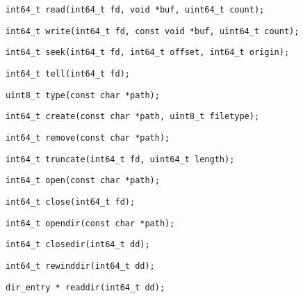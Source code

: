 \begin{lstlisting}[style=customc]
int64_t read(int64_t fd, void *buf, uint64_t count);
\end{lstlisting}
\begin{lstlisting}[style=customc]
int64_t write(int64_t fd, const void *buf, uint64_t count);
\end{lstlisting}
\begin{lstlisting}[style=customc]
int64_t seek(int64_t fd, int64_t offset, int64_t origin);
\end{lstlisting}
\begin{lstlisting}[style=customc]
int64_t tell(int64_t fd);
\end{lstlisting}
\begin{lstlisting}[style=customc]
uint8_t type(const char *path);
\end{lstlisting}
\begin{lstlisting}[style=customc]
int64_t create(const char *path, uint8_t filetype);
\end{lstlisting}
\begin{lstlisting}[style=customc]
int64_t remove(const char *path); 
\end{lstlisting}
\begin{lstlisting}[style=customc]
int64_t truncate(int64_t fd, uint64_t length);
\end{lstlisting}
\begin{lstlisting}[style=customc]
int64_t open(const char *path);
\end{lstlisting}
\begin{lstlisting}[style=customc]
int64_t close(int64_t fd);
\end{lstlisting}
\begin{lstlisting}[style=customc]
int64_t opendir(const char *path);
\end{lstlisting}
\begin{lstlisting}[style=customc]
int64_t closedir(int64_t dd);
\end{lstlisting}
\begin{lstlisting}[style=customc]
int64_t rewinddir(int64_t dd);
\end{lstlisting}
\begin{lstlisting}[style=customc]
dir_entry * readdir(int64_t dd);
\end{lstlisting}


